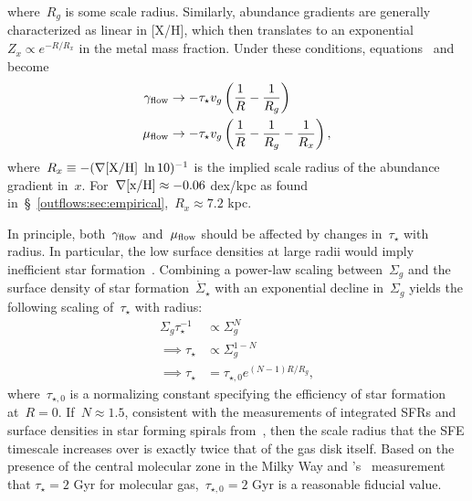where~$R_g$ is some scale radius.
Similarly, abundance gradients are generally characterized as linear in [X/H],
which then translates to an exponential~$Z_x \propto e^{-R / R_x}$ in the
metal mass fraction.
Under these conditions, equations~
and~ become
\begin{subequations}\begin{align}
\gamma_{\text{flow}} &\rightarrow -\tau_\star v_g
\left(\frac{1}{R} - \frac{1}{R_g}\right)
\label{outflows:eq:gamma-flow}
\\
\mu_{\text{flow}} &\rightarrow -\tau_\star v_g
\left(\frac{1}{R} - \frac{1}{R_g} - \frac{1}{R_x}\right),
\label{outflows:eq:mu-flow}
\end{align}\end{subequations}
where~$R_x \equiv -(\nabla\text{[X/H]}~\ln 10)^{-1}$ is the implied scale radius of the
abundance gradient in~$x$.
For~$\nabla\text{[x/H]} \approx -0.06$ dex/kpc as found
in~\S~\ref{outflows:sec:empirical},~$R_x \approx 7.2$ kpc.
\par
In principle, both~$\gamma_{\text{flow}}$ and~$\mu_{\text{flow}}$ should be affected by changes
in~$\tau_\star$ with radius.
In particular, the low surface densities at large radii would imply inefficient
star formation~\citep[i.e., higher~$\tau_\star$; e.g.,][]{delosReyes2019,
Kennicutt2021}.
Combining a power-law scaling between~$\Sigma_g$ and the surface density of
star formation~$\dot{\Sigma}_\star$ with an exponential decline in~$\Sigma_g$
yields the following scaling of~$\tau_\star$ with radius:
\begin{equation}\begin{split}
\Sigma_g \tau_\star^{-1} &\propto \Sigma_g^N
\\
\implies \tau_\star &\propto \Sigma_g^{1 - N}
\\
\implies \tau_\star &= \tau_{\star,0} e^{(N - 1) R / R_g},
\end{split}\end{equation}
where~$\tau_{\star,0}$ is a normalizing constant specifying the efficiency of
star formation at~$R = 0$.
If~$N \approx 1.5$, consistent with the measurements of integrated SFRs and
surface densities in star forming spirals from~\citet{Kennicutt1998}, then
the scale radius that the SFE timescale increases over is exactly twice that
of the gas disk itself.
Based on the presence of the central molecular zone in the Milky Way
\citep[e.g.,][]{Morris1996, Dahmen1998, PiercePrice2000, Hatchfield2020} and
\citeauthor{Leroy2008}'s~\citeyearpar{Leroy2008} measurement that
$\tau_\star = 2$ Gyr for molecular gas,~$\tau_{\star,0} = 2$ Gyr is a
reasonable fiducial value.


